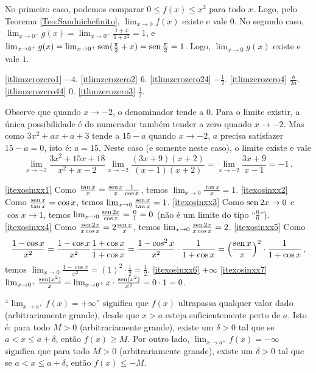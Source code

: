 \begin{Solution}{4.16}
No primeiro caso, podemos comparar $0\leq f(x)\leq x^2$ para todo $x$.
Logo,
pelo Teorema \ref{Teo:Sanduichefinito},
$\lim_{x\to 0}f(x)$ existe e vale $0$.
No segundo caso,
$\lim_{x\to 0^-}g(x)=\lim_{x\to 0^-}\frac{1+x}{1+x^2}=1$, e
$\lim_{x\to 0^+}g(x)=\lim_{x\to 0^+}\operatorname{sen}(\frac{\pi}{2}+x)=\operatorname{sen}
\tfrac{\pi}{2}=1$. Logo, $\lim_{x\to 0}g(x)$ existe e vale $1$.
\end{Solution}
\begin{Solution}{4.17}
\eqref{itlimzerozero1} $-4$.
\eqref{itlimzerozero2} $6$.
\eqref{itlimzerozero24} $-\tfrac12$.
\eqref{itlimzerozero4} $\frac{b}{2a}$.
\eqref{itlimzerozero44} $0$.
\eqref{itlimzerozero3} $\tfrac12$.
\end{Solution}
\begin{Solution}{4.18}
Observe que quando $x\to -2$, o denominador tende a $0$.
Para o limite existir, a única possibilidade é do numerador também
tender a zero quando $x\to -2$. Mas como $3x^2+ax+a+3$ tende a $15-a$
quando $x\to -2$, $a$ precisa satisfazer $15-a=0$, isto é: $a=15$.
Neste caso (e somente neste caso), o limite existe e vale
$$
\lim_{x\to -2}\frac{3x^2+15x+18}{x^2+x-2}
\lim_{x\to -2}\frac{(3x+9)(x+2)}{(x-1)(x+2)}=
\lim_{x\to -2}\frac{3x+9}{x-1}=-1\,.
$$
\end{Solution}
\begin{Solution}{4.19}
 \eqref{itexosinxx1}
Como $\frac{\tan x}{x}=\frac{\operatorname{sen} x}{x}\frac{1}{\cos x}$,
temos $\lim_{x\to 0}\tfrac{\tan x}{x}=1$.
\eqref{itexosinxx2}
Como $\frac{\operatorname{sen} x}{\tan x}=\cos x$, temos $\lim_{x\to 0}\tfrac{\operatorname{sen}
x}{\tan x}=1$.
\eqref{itexosinxx3} Como ${\operatorname{sen} 2x}\to 0$ e ${\cos x}\to 1$, temos $\lim_{x\to 0}\frac{\operatorname{sen} 2x}{\cos x}=\frac{0}{1}=0$ (não é um limite do tipo ``$\frac00$'').
\eqref{itexosinxx4}
Como $\frac{\operatorname{sen} 2x}{x\cos x}=2\frac{\operatorname{sen} x}{x}$,
temos $\lim_{x\to 0}\frac{\operatorname{sen} 2x}{x\cos x}=2$.
\eqref{itexosinxx5} Como
$$\frac{1-\cos x}{x^2}=\frac{1-\cos x}{x^2}\frac{1+\cos
x}{1+\cos x}=\frac{1-\cos^2x}{x^2}\cdot \frac{1}{1+\cos x}=\Bigl(\frac{\operatorname{sen} x}{x}\Bigr)^2\cdot \frac{1}{1+\cos x}\,,$$
temos
$\lim_{x\to 0}\tfrac{1-\cos x}{x^2}=(1)^2\cdot \frac12=\frac12$.
\eqref{itexosinxx6} $+\infty$
\eqref{itexosinxx7}  $\lim_{x\to 0^+}\tfrac{\operatorname{sen} (x^2)}{x}=\lim_{x\to
0^+}x\cdot\tfrac{\operatorname{sen}(x^2)}{x^2}=0\cdot 1=0$.
\end{Solution}
\begin{Solution}{4.20}
``$\lim_{x\to a^+}f(x)=+\infty$'' significa que $f(x)$ ultrapassa
qualquer valor dado (arbitrariamente grande), desde que $x>a$ esteja
suficientemente perto de $a$. Isto é: para todo $M>0$ (arbitrariamente
grande), existe um $\delta>0$ tal que se $a<x\leq a+\delta$, então
$f(x)\geq M$.
Por outro lado, $\lim_{x\to a^+}f(x)=-\infty$ significa que
para todo $M>0$ (arbitrariamente grande),
existe um $\delta>0$ tal que se $a<x\leq a+\delta$, então $f(x)\leq
-M$.
\end{Solution}
